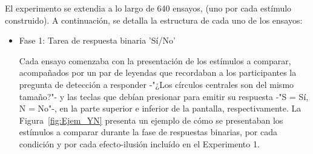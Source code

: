 \begin{itemize}
El experimento se extendia a lo largo de 640 ensayos, (uno por cada estímulo construido). A continuación, se detalla la estructura de cada uno de los ensayos:\\

\begin{itemize}
\item Fase 1: Tarea de respuesta binaria 'Sí/No'

Cada ensayo comenzaba con la presentación de los estímulos a comparar, acompañados por un par de leyendas que recordaban a los participantes la pregunta de detección a responder -"¿Los círculos centrales son del mismo tamaño?"- y las teclas que debían presionar para emitir su respuesta -"S = Sí, N = No"-, en la parte superior e inferior de la pantalla, respectivamente. La Figura~\ref{fig:Ejem_YN} presenta un ejemplo de cómo se presentaban los estímulos a comparar durante la fase de respuestas binarias, por cada condición y por cada efecto-ilusión incluído en el Experimento 1.\\


\end{itemize}
\end{itemize}

